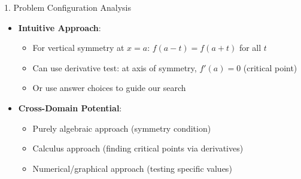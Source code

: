 \documentclass[12pt]{article}
\begin{document}
\begin{configbox}{1. Problem Configuration Analysis}
\begin{itemize}[leftmargin=*]
    \item \textbf{Intuitive Approach}: 
    \begin{itemize}
        \item For vertical symmetry at $x = a$: $f(a-t) = f(a+t)$ for all $t$
        \item Can use derivative test: at axis of symmetry, $f'(a) = 0$ (critical point)
        \item Or use answer choices to guide our search
    \end{itemize}
    
    \item \textbf{Cross-Domain Potential}: 
    \begin{itemize}
        \item Purely algebraic approach (symmetry condition)
        \item Calculus approach (finding critical points via derivatives)
        \item Numerical/graphical approach (testing specific values)
    \end{itemize}
\end{itemize}

\end{configbox}
\end{document}

